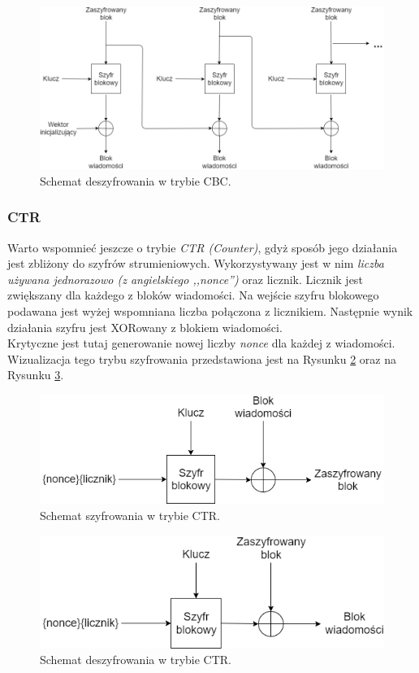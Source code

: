 \begin{figure}
    \centering
	\includegraphics[width=\textwidth]{content/images/cbc-dec-scheme}
    \caption{Schemat deszyfrowania w trybie CBC.}
    \label{cbc-dec}
\end{figure}

\subsubsection{CTR}
Warto wspomnieć jeszcze o trybie \textit{CTR (Counter)}, gdyż sposób jego działania jest zbliżony 
do szyfrów strumieniowych. Wykorzystywany jest w nim \textit{liczba używana jednorazowo (z angielskiego ,,nonce'')}
oraz licznik. Licznik jest zwiększany dla każdego z bloków wiadomości. 
Na wejście szyfru blokowego podawana jest wyżej wspomniana liczba połączona z licznikiem. Następnie wynik
działania szyfru jest XORowany z blokiem wiadomości. \\
Krytyczne jest tutaj generowanie nowej liczby \textit{nonce} dla każdej z wiadomości. \\
Wizualizacja tego trybu szyfrowania przedstawiona jest na Rysunku \ref{ctr-enc} oraz na Rysunku \ref{ctr-dec}.

\begin{figure}[t]
    \centering
	\includegraphics[width=\textwidth]{content/images/ctr-enc-scheme}
    \caption{Schemat szyfrowania w trybie CTR.}
    \label{ctr-enc}
\end{figure}
\begin{figure}[t]
    \centering
	\includegraphics[width=\textwidth]{content/images/ctr-dec-scheme}
    \caption{Schemat deszyfrowania w trybie CTR.}
    \label{ctr-dec}
\end{figure}

